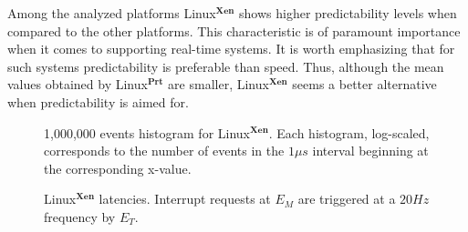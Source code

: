 \documentclass{acm_proc_article-sp}
\begin{document}
Among the analyzed platforms Linux$^\mathbf{Xen}$ shows higher predictability levels
when compared to the other platforms. This characteristic is of paramount importance
when it comes to sup\-porting real-time systems.  It is worth emphasizing that for
such systems predictability is preferable than speed. Thus, although the mean values
obtained by Linux$^\mathbf{Prt}$ are smaller, Linux$^\mathbf{Xen}$ seems a better
alternative when predic\-tability is aimed for.

\begin{figure}[h!tb]%
 \centering
 \label{fig:histo}%
 {\scalebox{0.64}{}} \hspace{10pt}%
 \caption{1,000,000 events histogram for Linux$^\mathbf{Xen}$. Each histogram, log-scaled,
 corresponds to the number of events in the $1 \mu s$ interval beginning
 at the corresponding x-value.
}
\end{figure}


\begin{figure*}[t!]%
 \centering
  \hspace{10pt}%

  \hspace{10pt}%

 \caption[Activation latencies]{Linux$^{\mathbf{Xen}}$ latencies. Interrupt requests
   at $E_M$ are triggered at a $20 Hz$ frequency by $E_T$.}
 \label{fig:latIrqAtiv2}%
\end{figure*}
\end{document}
